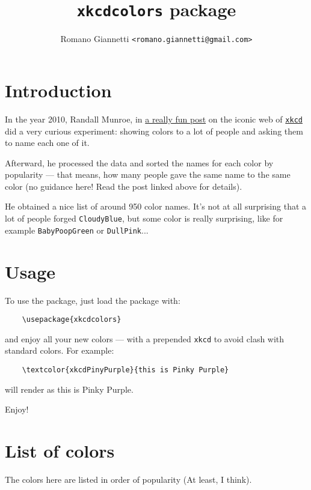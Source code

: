 \documentclass[12pt]{article}
\title{\texttt{xkcdcolors} package}
\author{Romano Giannetti \texttt{<romano.giannetti@gmail.com>}}
\begin{document}
\maketitle
\section{Introduction}

In the year 2010, Randall Munroe, in \href{https://blog.xkcd.com/2010/05/03/color-survey-results/}{a really fun post} on the iconic web of \href{https://xkcd.com/}{\texttt{xkcd}} did a very curious experiment: showing colors to a lot of people and asking them to name each one of it.

Afterward, he processed the data and sorted the names for each color by popularity --- that means, how many people gave the same name to the same color (no guidance here! Read the post linked above for details).

He obtained a nice list of around 950 color names. It's not at all surprising that a lot of people forged \texttt{CloudyBlue}, but some color is really surprising, like for example \texttt{BabyPoopGreen} or \texttt{DullPink}...

\section{Usage}
To use the package, just load the package with:

\begin{verbatim}
    \usepackage{xkcdcolors}
\end{verbatim}

\noindent and enjoy all your new colors --- with a prepended \texttt{xkcd} to avoid clash with standard colors. For example:

\begin{verbatim}
    \textcolor{xkcdPinyPurple}{this is Pinky Purple}
\end{verbatim}

\noindent will render as \textcolor{xkcdPinkyPurple}{this is Pinky Purple}.

\bigskip

\noindent Enjoy!

\section{List of colors}
The colors here are listed in order of popularity (At least, I think).
\end{document}

